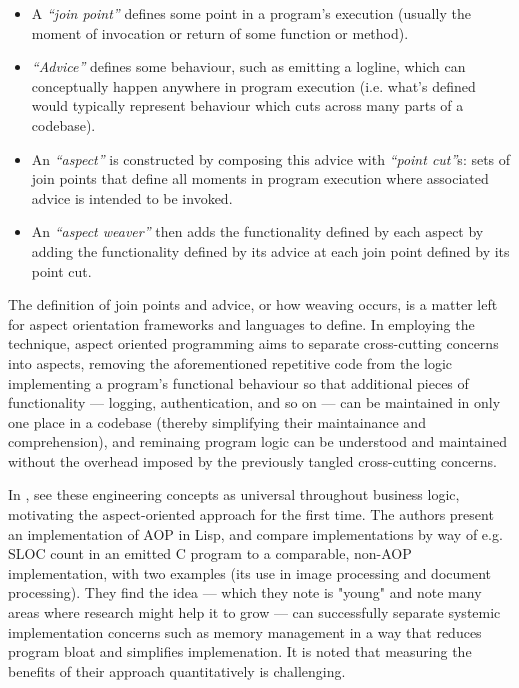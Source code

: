 \begin{itemize}
    \item A \emph{``join point''} defines some point in a program's execution
(usually the moment of invocation or return of some function or method).
    \item \emph{``Advice''} defines some behaviour, such as emitting a logline, which
    can conceptually happen anywhere in program execution (i.e. what's defined
    would typically represent behaviour which cuts across many parts of a
    codebase).
    \item An \emph{``aspect''} is constructed by composing this advice with
    \emph{``point cut''}s: sets of join points that define all moments in
    program execution where associated advice is intended to be invoked.
    \item An \emph{``aspect weaver''} then adds the functionality defined by
    each aspect by adding the functionality defined by its advice at each join
    point defined by its point cut.
\end{itemize}

The definition of join points and advice, or how weaving occurs, is a matter
left for aspect orientation frameworks and languages to define. In employing the
technique, aspect oriented programming aims to separate cross-cutting concerns
into aspects, removing the aforementioned repetitive code from the logic
implementing a program's functional behaviour so that additional pieces of
functionality --- logging, authentication, and so on --- can be maintained in
only one place in a codebase (thereby simplifying their maintainance and
comprehension), and reminaing program logic can be understood and maintained
without the overhead imposed by the previously tangled cross-cutting concerns.

In \cite{kiczales1997aspect}, \citeauthor{kiczales1997aspect} see these
engineering concepts as universal throughout business logic, motivating the
aspect-oriented approach for the first time. The authors present an
implementation of AOP in Lisp, and compare implementations by way of e.g. SLOC
count in an emitted C program to a comparable, non-AOP implementation, with two
examples (its use in image processing and document processing). They find the
idea --- which they note is "young" and note many areas where research might
help it to grow --- can successfully separate systemic implementation concerns
such as memory management in a way that reduces program bloat and simplifies
implemenation. It is noted that measuring the benefits of their approach
quantitatively is challenging.


